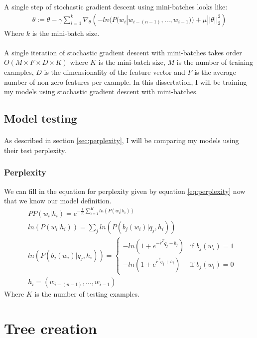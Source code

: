 A single step of stochastic gradient descent using mini-batches looks like:
\begin{align}
\theta := \theta - \gamma  \sum_{i=1}^{k} \nabla_\theta \left( -ln(P(w_i | w_{i-(n-1)},\dots, w_{i-1})) +  \mu ||\theta||^2_2 \right)
\end{align}
Where $k$ is the mini-batch size.
\paragraph{}
A single iteration of stochastic gradient descent with mini-batches takes order $O(M\times F \times D\times K)$ where $K$ is the mini-batch size, $M$ is the number of training examples, $D$ is the dimensionality of the feature vector and $F$ is the average number of non-zero features per example. In this dissertation, I will be training my models using stochastic gradient descent with mini-batches.

\subsection{Model testing}
\paragraph{}
As described in section \ref{sec:perplexity}, I will be comparing my models using their test perplexity.
\subsubsection{Perplexity}
We can fill in the equation for perplexity given by equation \ref{eq:perplexity} now that we know our model definition.
\begin{align}
&PP(w_i | h_i)=e^{- \frac{1}{K} \sum_{i=1}^K ln( P(w_i | h_i) ) }
\\
&ln(P(w_i | h_i )) = \sum_j ln(P(b_j(w_i) | q_j, h_i)) \nonumber
\\
&ln(P(b_j(w_i) | q_j, h_i)) =  
\begin{cases}
  -ln (1 + e^{-\hat{r}^T q_{j} -b_{j}}) & \text{if } b_j(w_i)  = 1 \\
  -ln (1 + e^{\hat{r}^T q_{j} +b_{j}})     & \text{if } b_j(w_i) = 0
  \end{cases} \nonumber
\\
 & h_i = ( w_{i-(n-1)},\dots, w_{i-1} ) \nonumber
\end{align}
Where $K$ is the number of testing examples. 


\section{Tree creation} \label{sec:treeCreation}
